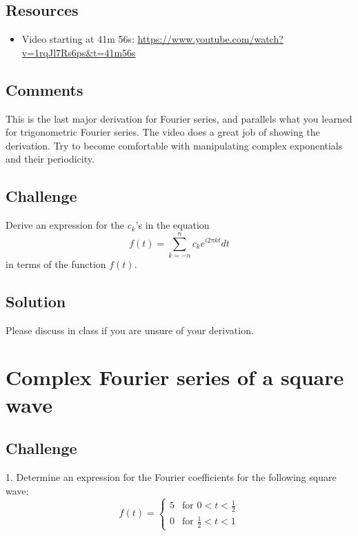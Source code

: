 \subsection*{Resources}
\begin{itemize}
    \item Video starting at 41m 56s: \url{https://www.youtube.com/watch?v=1rqJl7Rs6ps&t=41m56s}
\end{itemize}

\subsection*{Comments}
This is the last major derivation for Fourier series, and parallels what you learned for trigonometric Fourier series. The video does a great job of showing the derivation. Try to become comfortable with manipulating complex exponentials and their periodicity.

\subsection*{Challenge}
Derive an expression for the $c_k$'s in the equation
\begin{equation}
    f(t) = \sum_{k=-n}^{n} c_k e^{i 2 \pi k t} dt
\end{equation}
in terms of the function $f(t)$.

\subsection*{Solution}
Please discuss in class if you are unsure of your derivation.




\newpage
\section{Complex Fourier series of a square wave}

\subsection*{Challenge}
1. Determine an expression for the Fourier coefficients for the following square wave:
\begin{equation}
   f(t) =
   \begin{cases}
       5 & \text{for } 0 < t < \frac{1}{2} \\
       0 & \text{for } \frac{1}{2} < t < 1
   \end{cases} 
\end{equation}

